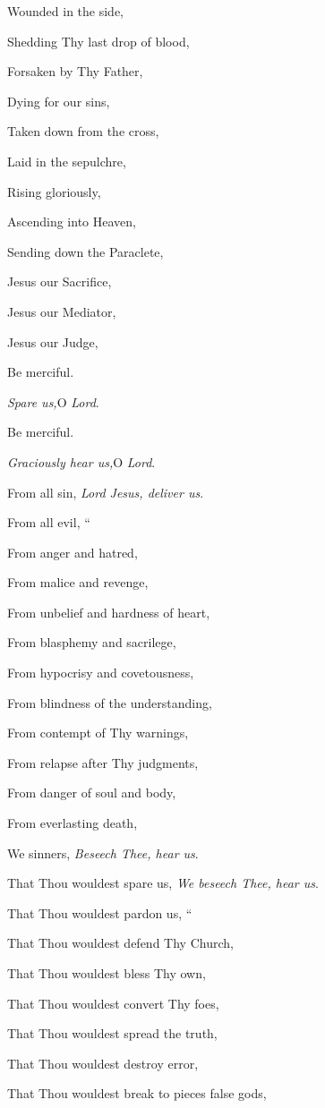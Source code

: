Wounded in the side,

Shedding Thy last drop of blood,

Forsaken by Thy Father,

Dying for our sins,

Taken down from the cross,

Laid in the sepulchre,

Rising gloriously,

Ascending into Heaven,

Sending down the Paraclete,

Jesus our Sacrifice,

Jesus our Mediator,

Jesus our Judge,

Be merciful.

\emph{Spare us,}O \emph{Lord}.

Be merciful.

\emph{Graciously hear us,}O \emph{Lord}.

From all sin,
\emph{Lord Jesus, deliver us}.

From all evil,
``

From anger and hatred, 

From malice and revenge,

From unbelief and hardness of heart,

From blasphemy and sacrilege,

From hypocrisy and covetousness,

From blindness of the understanding,

From contempt of Thy warnings,

From relapse after Thy judgments,

From danger of soul and body,

From everlasting death,

We sinners, \emph{Beseech Thee,
hear us}.

That Thou wouldest spare us,
\emph{We beseech Thee, hear us}.

That Thou wouldest pardon us,
``

That Thou wouldest defend Thy Church,

That Thou wouldest bless Thy own,

That Thou wouldest convert Thy foes,

That Thou wouldest spread the truth,

That Thou wouldest destroy error,

That Thou wouldest break to pieces false gods,

